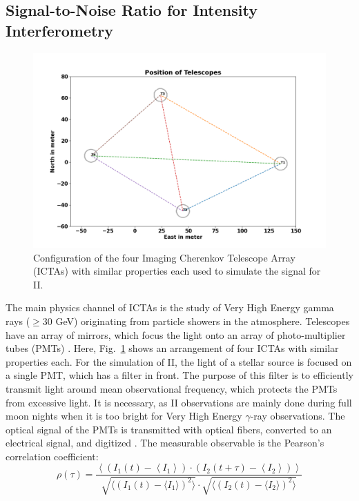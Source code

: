 \subsection{Signal-to-Noise Ratio for Intensity Interferometry}
\begin{figure}
	\centering
	\includegraphics[width=\linewidth]{fig/telescope.png}
	\caption{Configuration of the four Imaging Cherenkov Telescope Array (ICTAs) with similar properties each used to simulate the signal for II.}
	\label{fig:teles}
\end{figure}
The main physics channel of ICTAs is the study of Very High Energy gamma rays ($\geq 30$ GeV) originating from particle showers in the atmosphere. Telescopes have an array of mirrors, which focus the light onto an array of photo-multiplier tubes (PMTs) \citep{aleksic2016major}. Here, Fig.~\ref{fig:teles} shows an arrangement of four ICTAs with similar properties each. For the simulation of II, the light of a stellar source is focused on a single PMT, which has a filter in front. The purpose of this filter is to efficiently transmit light around mean observational frequency, which protects the PMTs from excessive light. It is necessary, as II observations are mainly done during full moon nights when it is too bright for Very High Energy $\gamma$-ray observations. The optical signal of the PMTs is transmitted with optical fibers, converted to an electrical signal, and digitized \citep{acciari2020optical}. The measurable observable is the Pearson's correlation coefficient:
\begin{equation}
	\rho(\tau) = \frac{\left\langle \left( I_1(t) - \left\langle I_1 \right\rangle \right) \cdot \left( I_2(t + \tau) - \left\langle I_2 \right\rangle \right) \right\rangle}{\sqrt{\langle \left( I_1(t) - \langle I_1 \rangle \right)^2 \rangle} \cdot \sqrt{\langle \left( I_2(t) - \langle I_2 \rangle \right) ^2 \rangle}}
	\label{eqn:pearson}
\end{equation}
